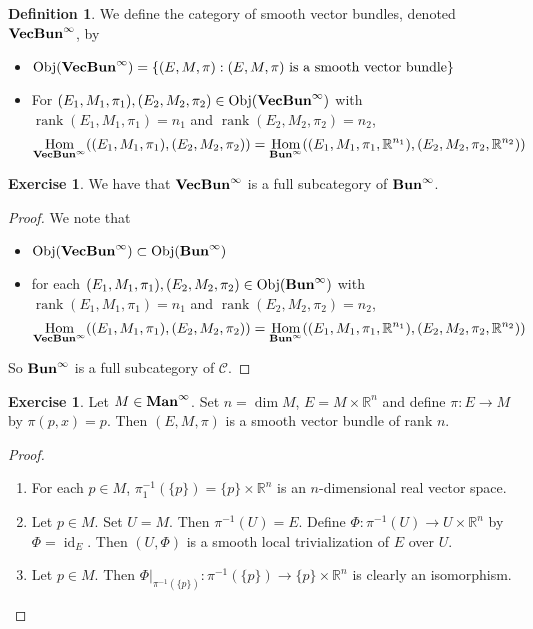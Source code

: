 \documentclass{book}
\theoremstyle{definition}
\newtheorem{defn}[definition]{Definition}
\newtheorem{ex}[definition]{Exercise}
\newcommand{\R}{\mathbb{R}}
\newcommand{\MC}{\mathcal{C}}
\DeclareMathOperator{\id}{id}
\DeclareMathOperator{\Obj}{Obj}
\DeclareMathOperator{\Hom}{Hom}
\DeclareMathOperator{\rnk}{rank}
\DeclareMathOperator*{\Maninf}{\text{\tbf{Man}}^{\infty}}
\DeclareMathOperator*{\Buninf}{\text{\tbf{Bun}}^{\infty}}
\DeclareMathOperator*{\VecBuninf}{\text{\tbf{VecBun}}^{\infty}}
\DeclareMathOperator*{\0}{\mbf{0}}
\DeclareMathOperator*{\1}{\mbf{1}}
\newcommand{\tbf}[1]{\textbf{#1}}
\begin{document}
\begin{defn}
	We define the category of smooth vector bundles, denoted $\VecBuninf$, by 
	\begin{itemize}
		\item $\Obj(\VecBuninf) = \{(E, M, \pi): (E, M, \pi) \text{ is a smooth vector bundle}\}$
		\item For $(E_1, M_1, \pi_1), (E_2, M_2, \pi_2) \in \Obj(\VecBuninf)$ with $\rnk (E_1, M_1, \pi_1) = n_1$ and $\rnk (E_2, M_2, \pi_2) = n_2$,  
		$$\Hom_{\VecBuninf}((E_1, M_1, \pi_1), (E_2, M_2, \pi_2)) = \Hom_{\Buninf}((E_1, M_1, \pi_1, \R^{n_1}), (E_2, M_2, \pi_2, \R^{n_2}))$$
	\end{itemize}
\end{defn}

\begin{ex}
	We have that $\VecBuninf$ is a full subcategory of $\Buninf$.
\end{ex}

\begin{proof} We note that 
	\begin{itemize}
		\item $\Obj(\VecBuninf) \subset \Obj(\Buninf)$
		\item for each $(E_1, M_1, \pi_1), (E_2, M_2, \pi_2) \in \Obj(\Buninf)$ with $\rnk (E_1, M_1, \pi_1) = n_1$ and $\rnk (E_2, M_2, \pi_2) = n_2$, 
		$$\Hom_{\VecBuninf}((E_1, M_1, \pi_1), (E_2, M_2, \pi_2)) = \Hom_{\Buninf}((E_1, M_1, \pi_1, \R^{n_1}), (E_2, M_2, \pi_2, \R^{n_2}))$$
	\end{itemize}
	So $\Buninf$ is a full subcategory of $\MC$.
\end{proof}

\begin{ex}
Let $M \in \Maninf$. Set $n = \dim M$, $E = M \times \R^n$ and define $\pi: E \rightarrow M$ by $\pi(p, x) = p $. Then $(E, M, \pi)$ is a smooth vector bundle of rank $n$.
\end{ex}

\begin{proof}\
\begin{enumerate}
\item For each $p \in M$, $\pi_1^{-1}(\{p\}) = \{p\} \times \R^n$ is an $n$-dimensional real vector space.
\item Let $p \in M$. Set $U = M$. Then $\pi^{-1}(U) = E$. Define $\Phi: \pi^{-1}(U) \rightarrow U \times \R^n$ by $\Phi = \id_E$. Then $(U, \Phi)$ is a smooth local trivialization of $E$ over $U$.   
\item Let $p \in M$. Then $\Phi|_{\pi^{-1}(\{p\})}: \pi^{-1}(\{p\}) \rightarrow \{p\} \times \R^n$ is clearly an isomorphism. 
\end{enumerate}
\end{proof}
\end{document}
